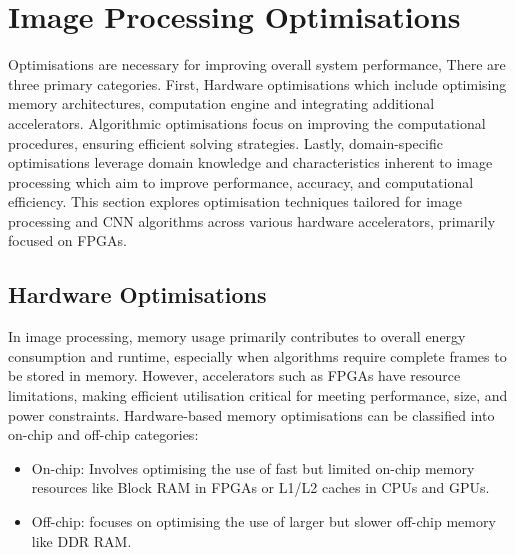 \section{Image Processing Optimisations}



Optimisations are necessary for improving overall system performance, There are three primary categories. First, Hardware optimisations which include optimising memory architectures, computation engine and integrating additional accelerators. Algorithmic optimisations focus on improving the computational procedures, ensuring efficient solving strategies. Lastly, domain-specific optimisations leverage domain knowledge and characteristics inherent to image processing which aim to improve performance, accuracy, and computational efficiency. This section explores optimisation techniques tailored for image processing and CNN algorithms across various hardware accelerators, primarily focused on FPGAs.

\subsection*{Hardware Optimisations}
In image processing, memory usage primarily contributes to overall energy consumption and runtime, especially when algorithms require complete frames to be stored in memory\cite{FanZhanYu17}. However, accelerators such as FPGAs have resource limitations, making efficient utilisation critical for meeting performance, size, and power constraints\cite{HajBenWal18}. Hardware-based memory optimisations can be classified into on-chip and off-chip categories:

\begin{itemize}
    \item On-chip: Involves optimising the use of fast but limited on-chip memory resources like Block RAM in FPGAs or L1/L2 caches in CPUs and GPUs.
    \item Off-chip: focuses on optimising the use of larger but slower off-chip memory like DDR RAM.
\end{itemize}

